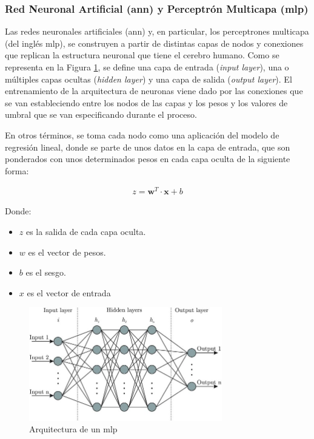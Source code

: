 \subsubsection{Red Neuronal Artificial (\acrshort{ann}) y Perceptrón Multicapa (\acrshort{mlp})}
\label{sec:dlann}

Las redes neuronales artificiales (\gls{ann}) y, en particular, los perceptrones multicapa (del inglés \gls{mlp}), se construyen a partir de distintas capas de nodos y conexiones que replican la estructura neuronal que tiene el cerebro humano. Como se representa en la Figura \ref{fig:ann}, se define una capa de entrada (\textit{input layer}), una o múltiples capas ocultas (\textit{hidden layer}) y una capa de salida (\textit{output layer}). El entrenamiento de la arquitectura de neuronas viene dado por las conexiones que se van estableciendo entre los nodos de las capas y los pesos y los valores de umbral que se van especificando durante el proceso. \cite{ibmann}

\vspace{3mm}

En otros términos, se toma cada nodo como una aplicación del modelo de regresión lineal, donde se parte de unos datos en la capa de entrada, que son ponderados con unos determinados pesos en cada capa oculta de la siguiente forma:

\begin{equation}
    \begin{aligned}
        z = \mathbf{w}^T \cdot \mathbf{x} + b
    \end{aligned}
\end{equation} 

Donde:
\begin{itemize}
    \renewcommand{\labelitemi}{}
    \item \(z\) es la salida de cada capa oculta. 
    \item \(w\) es el vector de pesos. 
    \item \(b\) es el sesgo.
    \item \(x\) es el vector de entrada
\end{itemize}

\vspace{3mm}

\begin{figure}[h!]
    \centering
    \includegraphics[width=0.75\textwidth]{img/teoria/ann.jpg}
    \caption{Arquitectura de un \acrshort{mlp} \cite{ann}}
    \label{fig:ann}
\end{figure}

